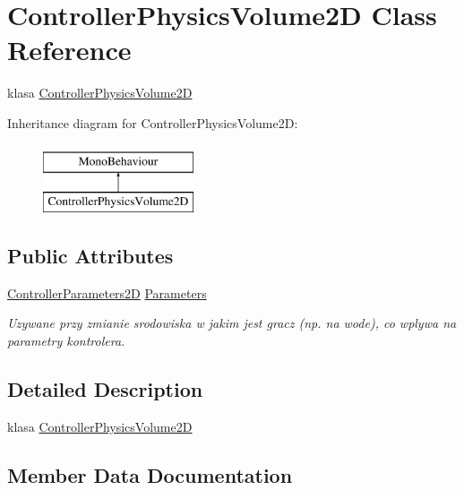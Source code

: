 \hypertarget{class_controller_physics_volume2_d}{}\section{Controller\+Physics\+Volume2\+D Class Reference}
\label{class_controller_physics_volume2_d}


klasa \hyperlink{class_controller_physics_volume2_d}{Controller\+Physics\+Volume2\+D}  


Inheritance diagram for Controller\+Physics\+Volume2\+D\+:\begin{figure}[H]
\begin{center}
\leavevmode
\includegraphics[height=2.000000cm]{class_controller_physics_volume2_d}
\end{center}
\end{figure}
\subsection*{Public Attributes}
\begin{DoxyCompactItemize}
\item 
\hyperlink{class_controller_parameters2_d}{Controller\+Parameters2\+D} \hyperlink{class_controller_physics_volume2_d_a57a01a60fe2b7a3ab0bd7808211a42b7}{Parameters}
\begin{DoxyCompactList}\small\item\em Uzywane przy zmianie srodowiska w jakim jest gracz (np. na wode), co wplywa na parametry kontrolera. \end{DoxyCompactList}\end{DoxyCompactItemize}


\subsection{Detailed Description}
klasa \hyperlink{class_controller_physics_volume2_d}{Controller\+Physics\+Volume2\+D} 



\subsection{Member Data Documentation}
\hypertarget{class_controller_physics_volume2_d_a57a01a60fe2b7a3ab0bd7808211a42b7}{}

